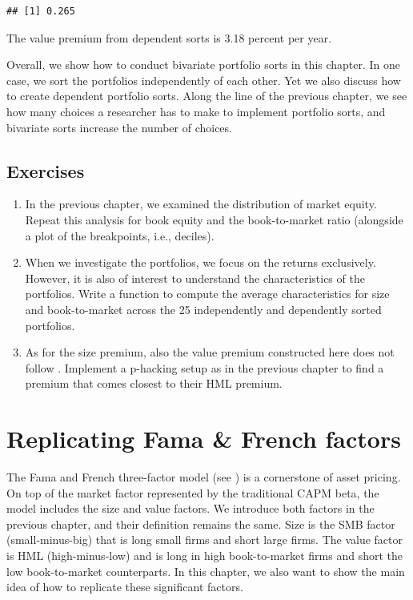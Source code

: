 \documentclass[
]{book}
\providecommand{\tightlist}{%
  \setlength{\itemsep}{0pt}\setlength{\parskip}{0pt}}
\begin{document}
\begin{verbatim}
## [1] 0.265
\end{verbatim}

The value premium from dependent sorts is 3.18 percent per year.

Overall, we show how to conduct bivariate portfolio sorts in this chapter. In one case, we sort the portfolios independently of each other. Yet we also discuss how to create dependent portfolio sorts. Along the line of the previous chapter, we see how many choices a researcher has to make to implement portfolio sorts, and bivariate sorts increase the number of choices.

\hypertarget{exercises-6}{%
\section{Exercises}\label{exercises-6}}

\begin{enumerate}
\def\labelenumi{\arabic{enumi}.}
\tightlist
\item
  In the previous chapter, we examined the distribution of market equity. Repeat this analysis for book equity and the book-to-market ratio (alongside a plot of the breakpoints, i.e., deciles).
\item
  When we investigate the portfolios, we focus on the returns exclusively. However, it is also of interest to understand the characteristics of the portfolios. Write a function to compute the average characteristics for size and book-to-market across the 25 independently and dependently sorted portfolios.
\item
  As for the size premium, also the value premium constructed here does not follow \citet{Fama1993}. Implement a p-hacking setup as in the previous chapter to find a premium that comes closest to their HML premium.
\end{enumerate}

\hypertarget{replicating-fama-french-factors}{%
\chapter{Replicating Fama \& French factors}\label{replicating-fama-french-factors}}

The Fama and French three-factor model (see \citet{Fama1993}) is a cornerstone of asset pricing. On top of the market factor represented by the traditional CAPM beta, the model includes the size and value factors. We introduce both factors in the previous chapter, and their definition remains the same. Size is the SMB factor (small-minus-big) that is long small firms and short large firms. The value factor is HML (high-minus-low) and is long in high book-to-market firms and short the low book-to-market counterparts. In this chapter, we also want to show the main idea of how to replicate these significant factors.
\end{document}
